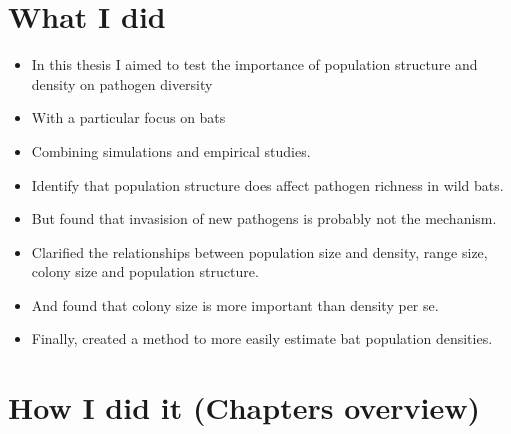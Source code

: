 
\section{What I did}

\begin{itemize}
\item In this thesis I aimed to test the importance of population structure and density on pathogen diversity
\item With a particular focus on bats
\item Combining simulations and empirical studies.
\item Identify that population structure does affect pathogen richness in wild bats.
\item But found that invasision of new pathogens is probably not the mechanism.  
\item Clarified the relationships between population size and density, range size, colony size and population structure.
\item And found that colony size is more important than density per se. 
\item Finally, created a method to more easily estimate bat population densities.
\end{itemize}



\section{How I did it (Chapters overview)}

